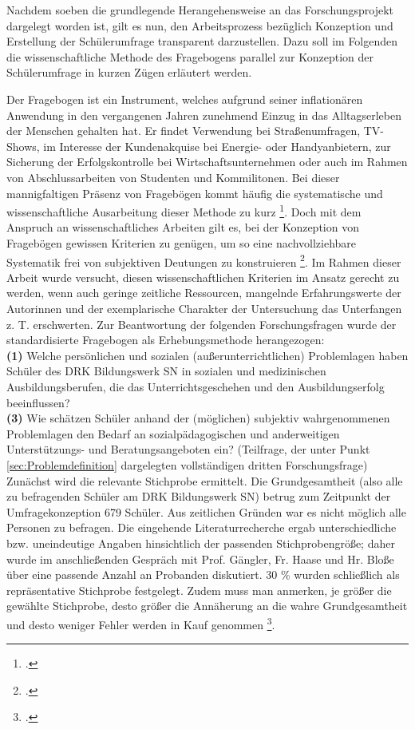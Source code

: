 Nachdem soeben die grundlegende Herangehensweise an das Forschungsprojekt dargelegt worden ist, gilt es nun, den Arbeitsprozess bezüglich Konzeption und Erstellung der Schülerumfrage transparent darzustellen. Dazu soll im Folgenden die wissenschaftliche Methode des Fragebogens parallel zur Konzeption der Schülerumfrage in kurzen Zügen erläutert werden.

Der Fragebogen ist ein Instrument, welches aufgrund seiner inflationären Anwendung in den vergangenen Jahren zunehmend Einzug in das Alltagserleben der Menschen gehalten hat. Er findet Verwendung bei Straßenumfragen, TV-Shows, im Interesse der Kundenakquise bei Energie- oder Handyanbietern, zur Sicherung der Erfolgskontrolle bei Wirtschaftsunternehmen oder auch im Rahmen von Abschlussarbeiten von Studenten und Kommilitonen. Bei dieser mannigfaltigen Präsenz von Fragebögen kommt häufig die systematische und wissenschaftliche Ausarbeitung dieser Methode zu kurz \footcite[vgl.][11]{Kallus2010}. Doch mit dem Anspruch an wissenschaftliches Arbeiten gilt es, bei der Konzeption von Fragebögen gewissen Kriterien zu genügen, um so eine nachvollziehbare Systematik frei von subjektiven Deutungen zu konstruieren \footcite[vgl.][9]{Mayer2013}. Im Rahmen dieser Arbeit wurde versucht, diesen wissenschaftlichen Kriterien im Ansatz gerecht zu werden, wenn auch geringe zeitliche Ressourcen, mangelnde Erfahrungswerte der Autorinnen und der exemplarische Charakter der Untersuchung das Unterfangen z. T. erschwerten. Zur Beantwortung der folgenden Forschungsfragen wurde der standardisierte Fragebogen als Erhebungsmethode herangezogen:\\
 

\noindent
\textbf{(1)} Welche persönlichen und sozialen (außerunterrichtlichen) Problemlagen haben Schüler des DRK Bildungswerk SN in sozialen und medizinischen Ausbildungsberufen, die das Unterrichtsgeschehen und den Ausbildungserfolg beeinflussen?\\

\noindent
\textbf{(3)} Wie schätzen Schüler anhand der (möglichen) subjektiv wahrgenommenen Problemlagen den Bedarf an sozialpädagogischen und anderweitigen Unterstützungs- und Beratungsangeboten ein? (Teilfrage, der unter Punkt \ref{sec:Problemdefinition} dargelegten vollständigen dritten Forschungsfrage)\\

\noindent
Zunächst wird die relevante Stichprobe ermittelt. Die Grundgesamtheit (also alle zu befragenden Schüler am DRK Bildungswerk SN) betrug zum Zeitpunkt der Umfragekonzeption 679 Schüler. Aus zeitlichen Gründen war es nicht möglich alle Personen zu befragen. Die eingehende Literaturrecherche ergab unterschiedliche bzw. uneindeutige Angaben hinsichtlich der passenden Stichprobengröße; daher wurde im anschließenden Gespräch mit Prof. Gängler, Fr. Haase und Hr. Bloße über eine passende Anzahl an Probanden diskutiert. 30 \% wurden schließlich als repräsentative Stichprobe festgelegt. Zudem muss man anmerken, je größer die gewählte Stichprobe, desto größer die Annäherung an die wahre Grundgesamtheit und desto weniger Fehler werden in Kauf genommen \footcite[vgl.][65f]{Mayer2013}. 

